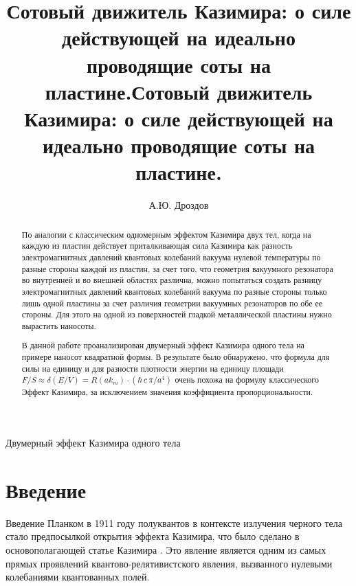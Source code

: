 \documentclass[11pt]{article}
\author{А.Ю. Дроздов}
\title{Сотовый движитель Казимира: о силе действующей на идеально проводящие соты на пластине.}
\begin{document}
    
    \maketitle
    
    

    
    \title{Сотовый движитель Казимира: о силе действующей на идеально проводящие соты на пластине.}

    \begin{abstract}

По аналогии с классическим одномерным эффектом Казимира двух тел, когда на каждую из пластин действует приталкивающая сила Казимира как разность электромагнитных давлений квантовых колебаний вакуума нулевой температуры по разные стороны каждой из пластин, за счет того, что геометрия вакуумного резонатора во внутренней и во внешней областях различна, можно попытаться создать разницу электромагнитных давлений квантовых колебаний вакуума по разные стороны только лишь одной пластины за счет различия геометрии вакуумных резонаторов по обе ее стороны. Для этого на одной из поверхностей гладкой металлической пластины нужно вырастить наносоты.

В данной работе проанализирован двумерный эффект Казимира одного тела на примере наносот квадратной формы. В результате было обнаружено, что формула для силы на единицу и для разности плотности энергии на единицу площади $F/S \approx \delta\left(E/V\right) = R\left(a k_m\right)\cdot\left(\hbar\,c\,\pi/{a^4}\right)$ очень похожа на формулу классического Эффект Казимира, за исключением значения коэффициента пропорциональности.

\end{abstract}

    \begin{keywords}
Двумерный эффект Казимира одного тела
\end{keywords}

    \section{Введение}\label{ux432ux432ux435ux434ux435ux43dux438ux435}

Введение Планком в 1911 году полуквантов в контексте излучения черного
тела стало предпосылкой открытия эффекта Казимира, что было сделано в
основополагающей статье Казимира \cite{Casimir1948}. Это явление
является одним из самых прямых проявлений квантово-релятивистского
явления, вызванного нулевыми колебаниями квантованных полей.
\end{document}
